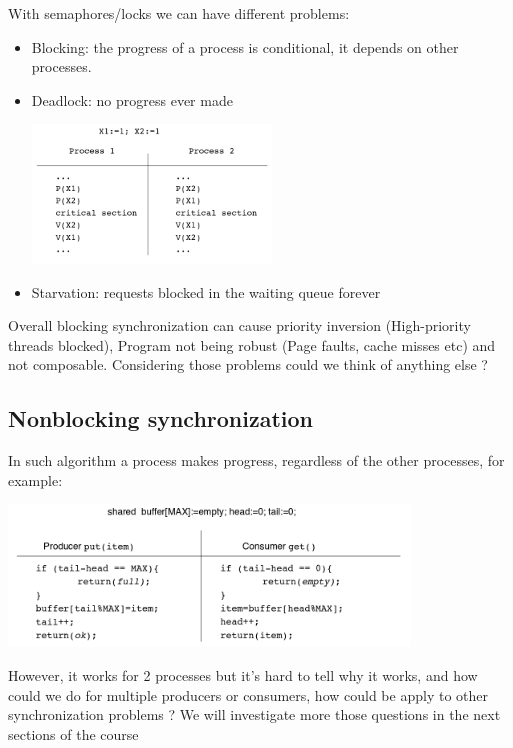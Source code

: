 \documentclass{article}
\theoremstyle{definition}
\begin{document}
With semaphores/locks we can have different problems:
\begin{itemize}
	\item Blocking: the progress of a process is conditional, it depends on other processes.
	\item Deadlock: no progress ever made
\begin{center}
	\includegraphics[width=0.5\textwidth]{pb_dead_lock}
\end{center}
	\item Starvation: requests blocked in the waiting queue forever
\end{itemize}

Overall blocking synchronization can cause priority inversion (High-priority threads blocked), Program not being robust (Page faults, cache misses etc) and not composable. Considering those problems could we think of anything else ?

\subsection{Nonblocking synchronization}
In such algorithm a process makes progress, regardless of the other processes, for example:
\begin{center}
	\includegraphics[width=0.8\textwidth]{non_block_prod_consom}
\end{center}

However, it works for 2 processes but it's hard to tell why it works, and how could we do for multiple producers or consumers, how could be apply to other synchronization problems ? We will investigate more those questions in the next sections of the course
\end{document}
